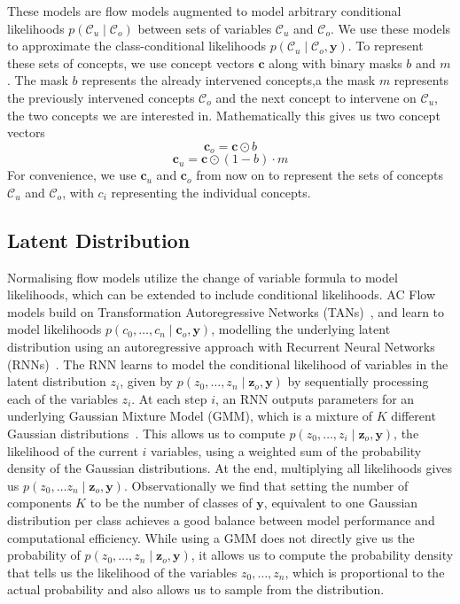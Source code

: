 These models are 
flow models augmented to model arbitrary conditional likelihoods $p(\mathcal{C}_u \mid \mathcal{C}_o)$
between sets of variables $\mathcal{C}_u$ and $\mathcal{C}_o$.
We use these models to approximate the class-conditional
likelihoods
$p(\mathcal{C}_u \mid \mathcal{C}_o, \mathbf{y})$. To represent
these sets of concepts,
we use concept vectors $\mathbf{c}$ along with
binary masks $b$ and $m$.
The mask $b$ represents
the already intervened concepts,a  the mask $m$ represents the previously intervened concepts $\mathcal{C}_o$ and the next concept to intervene on
$\mathcal{C}_u$, the two concepts we are interested in.
Mathematically this gives us two concept vectors
\[\mathbf{c}_o = \mathbf{c} \odot b\]
\[\mathbf{c}_u = \mathbf{c} \odot (1 - b) \cdot m\]
For convenience, we use $\mathbf{c}_u$ and $\mathbf{c}_o$ from now on
to represent the sets of concepts $\mathcal{C}_u$ and $\mathcal{C}_o$, with
$c_i$ representing the individual concepts.

\subsection{Latent Distribution}
Normalising flow models utilize the change of variable formula to model likelihoods,
which can be extended to include conditional likelihoods. AC Flow models build on
Transformation Autoregressive
Networks (TANs)~\cite{tans}, and learn to model 
likelihoods $p(c_0,\ldots, c_n \mid \mathbf{c}_o ,\mathbf{y})$,
modelling the underlying latent distribution using an autoregressive approach with Recurrent
Neural Networks (RNNs)~\cite{rnn}. The RNN learns to model the conditional likelihood of variables in the latent distribution $z_i$, given by
$p(z_0, \ldots, z_n \mid \mathbf{z}_o , \mathbf{y})$ by sequentially processing each of the variables
 $z_i$.
At each step $i$, an RNN outputs parameters for an underlying Gaussian Mixture Model (GMM),
which is a mixture of $K$ different Gaussian distributions~\cite{gmm}.
This allows us to compute $p(z_0, \ldots, z_i \mid \mathbf{z}_o , \mathbf{y})$,
the likelihood of the current $i$ variables,
using a weighted
sum of the probability density of the Gaussian distributions. At the end,
multiplying all likelihoods gives us $p(z_0, \ldots z_n \mid  \mathbf{z}_o, \mathbf{y})$. Observationally
we find that setting the number of components $K$ to be the number of classes of
$\mathbf{y}$, equivalent to one Gaussian distribution per 
class 
achieves
a good balance between model performance and computational efficiency.
While using a GMM does not directly give us the probability of
$p(z_0, \ldots, z_n \mid \mathbf{z}_o , \mathbf{y})$, 
it allows us to compute the probability density that tells us the likelihood of the
 variables $z_0, \ldots, z_n$, which is proportional
 to the actual probability and also allows us to sample from the distribution.

